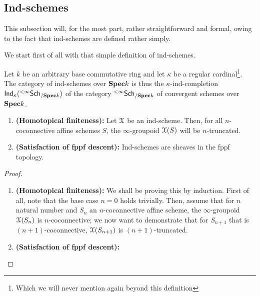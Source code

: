         \subsection{Ind-schemes}
            This subsection will, for the most part, rather straightforward and formal, owing to the fact that ind-schemes are defined rather simply.
            
            We start first of all with that simple definition of ind-schemes.
            \begin{definition} \label{def: ind-schemes}
                Let $k$ be an arbitrary base commutative ring and let $\kappa$ be a regular cardinal\footnote{Which we will never mention again beyond this definition}. The category of ind-schemes over $\mathbf{Spec} k$ is thus the $\kappa$-ind-completion $\mathsf{Ind}_{\kappa}({}^{< \infty}\mathsf{Sch}_{/\mathbf{Spec} k})$ of the category ${}^{< \infty}\mathsf{Sch}_{/\mathbf{Spec} k}$ of convergent schemes over $\mathbf{Spec} k$.
            \end{definition}
            
            \begin{proposition} \label{prop: ind_schemes_satisfy_fppf_descent}
                \noindent
                \begin{enumerate}
                    \item \textbf{(Homotopical finiteness):} Let $\mathcal{X}$ be an ind-scheme. Then, for all $n$-coconnective affine schemes $S$, the $\infty$-groupoid $\mathcal{X}(S)$ will be $n$-truncated.
                    \item \textbf{(Satisfaction of fppf descent):} Ind-schemes are sheaves in the fppf topology.
                \end{enumerate}
            \end{proposition}
                \begin{proof}
                    \noindent
                    \begin{enumerate}
                        \item \textbf{(Homotopical finiteness):} We shall be proving this by induction. First of all, note that the base case $n = 0$ holds trivially. Then, assume that for $n$ natural number and $S_n$ an $n$-coconnective affine scheme, the $\infty$-groupoid $\mathcal{X}(S_n)$ is $n$-coconnective; we now want to demonstrate that for $S_{n + 1}$ that is $(n + 1)$-coconnective, $\mathcal{X}(S_{n + 1})$ is $(n + 1)$-truncated. 
                        \item \textbf{(Satisfaction of fppf descent):}
                    \end{enumerate}
                \end{proof}
        

